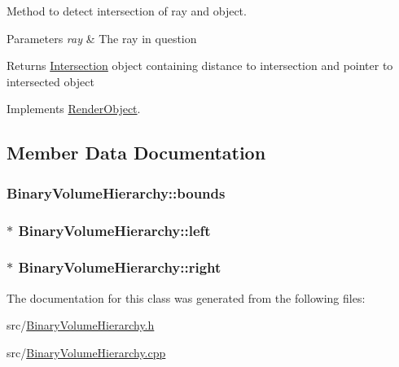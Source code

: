 Method to detect intersection of ray and object. 


\begin{DoxyParams}{Parameters}
{\em ray} & The ray in question \\
\hline
\end{DoxyParams}
\begin{DoxyReturn}{Returns}
\hyperlink{classIntersection}{Intersection} object containing distance to intersection and pointer to intersected object 
\end{DoxyReturn}


Implements \hyperlink{classRenderObject_aa844ad2c5ef0c2b79faef2ed0af553bb}{Render\+Object}.



\subsection{Member Data Documentation}
\subsubsection[{\texorpdfstring{bounds}{bounds}}]{ Binary\+Volume\+Hierarchy\+::bounds\hspace{0.3cm}{\ttfamily [private]}}\hypertarget{classBinaryVolumeHierarchy_a2722a35a0c3c6fee488f186c31869b53}{}\label{classBinaryVolumeHierarchy_a2722a35a0c3c6fee488f186c31869b53}
\subsubsection[{\texorpdfstring{left}{left}}]{$\ast$ Binary\+Volume\+Hierarchy\+::left\hspace{0.3cm}{\ttfamily [private]}}\hypertarget{classBinaryVolumeHierarchy_a76372fd6f7d6a5783d9b8688fc40d5b4}{}\label{classBinaryVolumeHierarchy_a76372fd6f7d6a5783d9b8688fc40d5b4}
\subsubsection[{\texorpdfstring{right}{right}}]{$\ast$ Binary\+Volume\+Hierarchy\+::right\hspace{0.3cm}{\ttfamily [private]}}\hypertarget{classBinaryVolumeHierarchy_a3b950d10a084fedfeaa02727d654b782}{}\label{classBinaryVolumeHierarchy_a3b950d10a084fedfeaa02727d654b782}


The documentation for this class was generated from the following files\+:\begin{DoxyCompactItemize}
\item 
src/\hyperlink{BinaryVolumeHierarchy_8h}{Binary\+Volume\+Hierarchy.\+h}\item 
src/\hyperlink{BinaryVolumeHierarchy_8cpp}{Binary\+Volume\+Hierarchy.\+cpp}\end{DoxyCompactItemize}
